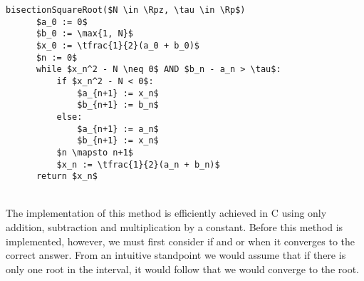\begin{lstlisting}[frame=single,mathescape,caption={Bisection Method for Square Roots},label={PCD_"Square Root Bisection Method"}]
  bisectionSquareRoot($N \in \Rpz, \tau \in \Rp$)
      $a_0 := 0$
      $b_0 := \max{1, N}$
      $x_0 := \tfrac{1}{2}(a_0 + b_0)$
      $n := 0$
      while $x_n^2 - N \neq 0$ AND $b_n - a_n > \tau$:
          if $x_n^2 - N < 0$:
              $a_{n+1} := x_n$
              $b_{n+1} := b_n$
          else:
              $a_{n+1} := a_n$
              $b_{n+1} := x_n$
          $n \mapsto n+1$
          $x_n := \tfrac{1}{2}(a_n + b_n)$
      return $x_n$
\end{lstlisting}\\

The implementation of this method is efficiently achieved in C using only addition, subtraction and multiplication by a constant. Before this method is implemented, however, we must first consider if and or when it converges to the correct answer. From an intuitive standpoint we would assume that if there is only one root in the interval, it would follow that we would converge to the root.

